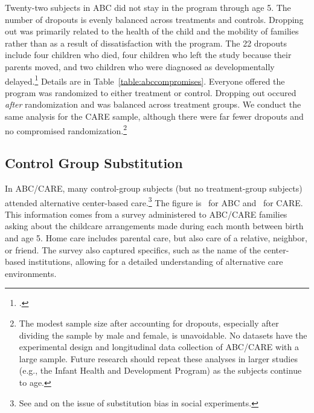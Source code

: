 Twenty-two subjects in ABC did not stay in the program through age 5. The number of dropouts is evenly balanced across treatments and controls. Dropping out was primarily related to the health of the child and the mobility of families rather than as a result of  dissatisfaction with the program. The 22 dropouts include four children who died, four children who left the study because their parents moved, and two children who were diagnosed as developmentally delayed.\footnote{\citet{Burchinal_Campbell_etal_1997_CD}.} Details are in Table~\ref{table:abccompromises}. Everyone offered the program was randomized to either treatment or control. Dropping out occured \emph{after} randomization and was balanced across treatment groups. We conduct the same analysis for the CARE sample, although there were far fewer dropouts and no compromised randomization.\footnote{The modest sample size after accounting for dropouts, especially after dividing the sample by male and female, is unavoidable. No datasets have the experimental design and longitudinal data collection of ABC/CARE with a large sample. Future research should repeat these analyses in larger studies (e.g., the Infant Health and Development Program) as the subjects continue to age.}

\subsection{Control Group Substitution}

In ABC/CARE, many control-group subjects (but no treatment-group subjects) attended alternative center-based care.\footnote{See \cite{Heckman_Hohmann_etal_2000_QJE} and \citet{Kline_Walters_2016_QJE} on the issue of substitution bias in social experiments.} The figure is \treatsubsabc\ for ABC and \treatsubscarec\ for CARE. This information comes from a survey administered to ABC/CARE families asking about the childcare arrangements made during each month between birth and age 5. Home care includes parental care, but also care of a relative, neighbor, or friend. The survey also captured specifics, such as the name of the center-based institutions, allowing for a detailed understanding of alternative care environments.

